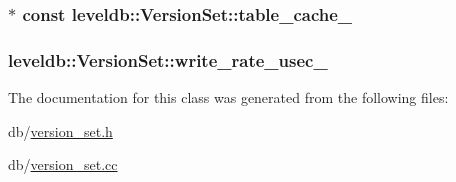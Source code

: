 \subsubsection[{table\+\_\+cache\+\_\+}]{$\ast$ const leveldb\+::\+Version\+Set\+::table\+\_\+cache\+\_\+\hspace{0.3cm}{\ttfamily [private]}}\label{classleveldb_1_1_version_set_afaca99abf7dea9ca06bc9dbb2f0a9ebe}
\hypertarget{classleveldb_1_1_version_set_a251dbfabd4dfa0ad6672a598800437fe}{}
\subsubsection[{write\+\_\+rate\+\_\+usec\+\_\+}]{ leveldb\+::\+Version\+Set\+::write\+\_\+rate\+\_\+usec\+\_\+\hspace{0.3cm}{\ttfamily [private]}}\label{classleveldb_1_1_version_set_a251dbfabd4dfa0ad6672a598800437fe}


The documentation for this class was generated from the following files\+:\begin{DoxyCompactItemize}
\item 
db/\hyperlink{version__set_8h}{version\+\_\+set.\+h}\item 
db/\hyperlink{version__set_8cc}{version\+\_\+set.\+cc}\end{DoxyCompactItemize}
